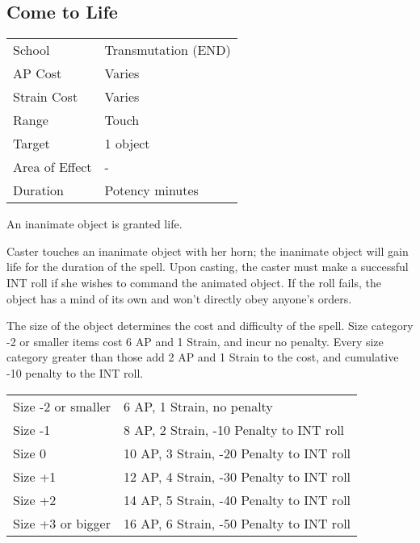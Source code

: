 \documentclass[11pt,a4paper,twocolumn]{book}
\begin{document}
\subsection*{Come to Life}
{
	\begin{tabu} to 75mm{| X[l,4] | X[l,7] |}
		\hline
		School 			& Transmutation (END) 	\\
		AP Cost	      	& Varies 				\\
		Strain Cost     & Varies 				\\
		Range     		& Touch 				\\
		Target      	& 1 object 				\\
		Area of Effect  & - 	 				\\
		Duration     	& Potency minutes 		\\ \hline
	\end{tabu}
	
}

\medskip

An inanimate object is granted life.

Caster touches an inanimate object with her horn; the inanimate object will gain life for the duration of the spell. Upon casting, the caster must make a successful INT roll if she wishes to command the animated object. If the roll fails, the object has a mind of its own and won't directly obey anyone's orders.

The size of the object determines the cost and difficulty of the spell. Size category -2 or smaller items cost 6 AP and 1 Strain, and incur no penalty. Every size category greater than those add 2 AP and 1 Strain to the cost, and cumulative -10 penalty to the INT roll.

\medskip

{
	\begin{tabu} to 75mm{| X[l,4] | X[l,7] |}
		\hline
		Size -2 or smaller		&  	6 AP, 1 Strain, no penalty\\
		Size -1	      			&  	8 AP, 2 Strain, -10 Penalty to INT roll			\\
		Size 0     				&  	10 AP, 3 Strain, -20 Penalty to INT roll		\\
		Size +1     			&  	12 AP, 4 Strain, -30 Penalty to INT roll		\\
		Size +2      			&  	14 AP, 5 Strain, -40 Penalty to INT roll		\\
		Size +3 or bigger  		&  	16 AP, 6 Strain, -50 Penalty to INT roll 		\\ \hline
	\end{tabu}
	
}
\end{document}
